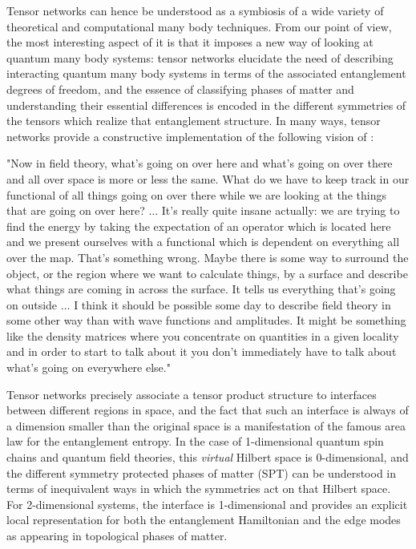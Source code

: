 \documentclass[rmp,aps,reprint,superscriptaddress,nobalancelastpage]{revtex4-1}
\begin{document}
Tensor networks can hence be understood as a symbiosis of a wide variety of theoretical and computational many body techniques. From our point of view, the most interesting aspect of it is that it imposes a new way of looking at quantum many body systems: tensor networks elucidate the need of describing interacting quantum many body systems in terms of the associated entanglement degrees of freedom, and the essence of classifying phases of matter and understanding their essential differences is encoded in the different symmetries of the tensors which realize that entanglement structure. In many ways, tensor networks provide a constructive implementation of the following vision of \citet{Feynman:variational}:

\begin{displayquote}
    "Now in field theory, what's going on over here and what's going on over there and all over space is more or less the same. What do we have to keep track in our functional of all things going on over there while we are looking at the things that are going on over here? $\ldots$ It’s really quite insane actually: we are trying to find the energy by taking the expectation of an operator which is located here and we present ourselves with a functional which is dependent on everything all over the map. That’s something wrong. Maybe there is some way to surround the object, or the region where we want to calculate things, by a surface and describe what things are coming in across the surface. It tells us everything that’s going on outside  $\ldots$   I think it should be possible some day to describe field theory in some other way than with wave functions and amplitudes. It might be something like the density matrices where you concentrate on quantities in a given locality and in order to start to talk about it you don't immediately have to talk about what's going on everywhere else."
\end{displayquote}

Tensor networks precisely associate a tensor product structure to interfaces between different regions in space, and the fact that such an interface is always of a dimension smaller than the original space is a manifestation of the famous area law for the entanglement entropy. In the case of 1-dimensional quantum spin chains and quantum field theories, this \emph{virtual} Hilbert space is 0-dimensional, and the different symmetry protected phases of matter (SPT) can be understood in terms of inequivalent ways in which the symmetries act on that Hilbert space. For 2-dimensional systems, the interface is 1-dimensional and provides an explicit local representation for both the entanglement Hamiltonian and the edge modes as appearing in topological phases of matter.
\end{document}
